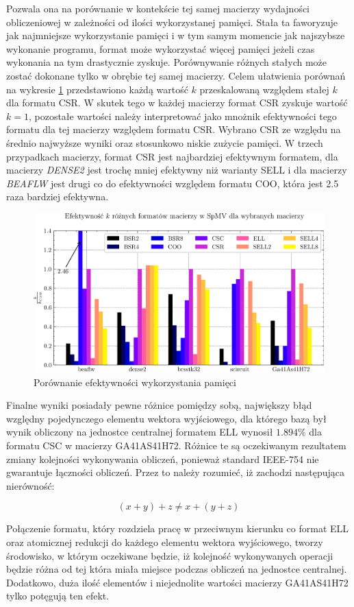 Pozwala ona na porównanie w kontekście tej samej macierzy wydajności obliczeniowej w zależności od ilości wykorzystanej pamięci.
Stała ta faworyzuje jak najmniejsze wykorzystanie pamięci i w tym samym momencie jak najszybsze wykonanie programu, format może wykorzystać więcej pamięci jeżeli czas wykonania na tym drastycznie zyskuje.
Porównywanie różnych stałych może zostać dokonane tylko w obrębie tej samej macierzy.
Celem ułatwienia porównań na wykresie \ref{all_k_plot} przedstawiono każdą wartość $k$ przeskalowaną względem stałej $k$ dla formatu CSR.
W skutek tego w każdej macierzy format CSR zyskuje wartość $k = 1$, pozostałe wartości należy interpretować jako mnożnik efektywności tego formatu dla tej macierzy względem formatu CSR.
Wybrano CSR ze względu na średnio najwyższe wyniki oraz stosunkowo niskie zużycie pamięci.
W trzech przypadkach macierzy, format CSR jest najbardziej efektywnym formatem, dla macierzy \textit{DENSE2} jest trochę mniej efektywny niż warianty SELL i dla macierzy \textit{BEAFLW} jest drugi co do efektywności względem formatu COO, która jest 2.5 raza bardziej efektywna.

\begin{figure}[!htb]
    \centering
    \includegraphics[width=\linewidth]{result_plots/barchart_memory.png}
    \caption{Porównanie efektywności wykorzystania pamięci}\label{all_k_plot}
\end{figure}

Finalne wyniki posiadały pewne różnice pomiędzy sobą, największy błąd względny pojedynczego elementu wektora wyjściowego, dla którego bazą był wynik obliczony na jednostce centralnej formatem ELL wynosił $1.894\%$ dla formatu CSC w macierzy GA41AS41H72.
Różnice te są oczekiwanym rezultatem zmiany kolejności wykonywania obliczeń, ponieważ standard IEEE-754  \cite{FloatPoint} nie gwarantuje łączności obliczeń.
Przez to należy rozumieć, iż zachodzi następująca nierówność:

\begin{equation}
    (x+y)+z \neq x+(y+z)
\end{equation}

Połączenie formatu, który rozdziela pracę w przeciwnym kierunku co format ELL oraz atomicznej redukcji do każdego elementu wektora wyjściowego, tworzy środowisko, w którym oczekiwane będzie, iż kolejność wykonywanych operacji będzie różna od tej która miała miejsce podczas obliczeń na jednostce centralnej.
Dodatkowo, duża ilość elementów i niejednolite wartości macierzy GA41AS41H72 tylko potęgują ten efekt. 